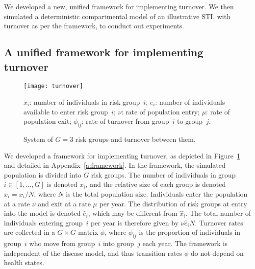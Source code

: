 We developed a new, unified framework for implementing turnover. 
We then simulated a deterministic compartmental model of an illustrative STI,
with turnover as per the framework,
to conduct out experiments.
\subsection{A unified framework for implementing turnover}
\label{ss:framework}
\begin{figure}
  \centering
  \texttt{[image: turnover]}
  \caption{System of $G = 3$ risk groups and turnover between them.}
  \footnotesize\raggedright
  $x_i$: number of individuals in risk group~$i$;
  $e_i$: number of individuals available to enter risk group~$i$;
  $\nu$: rate of population entry;
  $\mu$: rate of population exit;
  $\phi_{ij}$: rate of turnover from group~$i$ to group~$j$.
  \label{fig:system}
\end{figure}
We developed a framework for implementing turnover,  
as depicted in Figure~\ref{fig:system}
and detailed in Appendix~\ref{a:framework}. 
In the framework, the simulated population is divided into $G$ risk groups.
The number of individuals in group $i \in [1, \dots, G]$ is denoted $x_i$,
and the relative size of each group is denoted $\hat{x}_i = x_i / N$,
where $N$ is the total population size.
Individuals enter the population at a rate $\nu$ and exit at a rate $\mu$ per year.
The distribution of risk groups at entry into the model
is denoted $\hat{e}_i$, which may be different from $\hat{x}_i$.
The total number of individuals entering group~$i$ per year
is therefore given by $\nu \hat{e}_i N$.
Turnover rates are collected in a $G \times G$ matrix $\phi$,
where $\phi_{ij}$ is the proportion of individuals in group~$i$
who move from group~$i$ into group~$j$ each year.
The framework is independent of the disease model,
and thus transition rates $\phi$ do not depend on health states.
